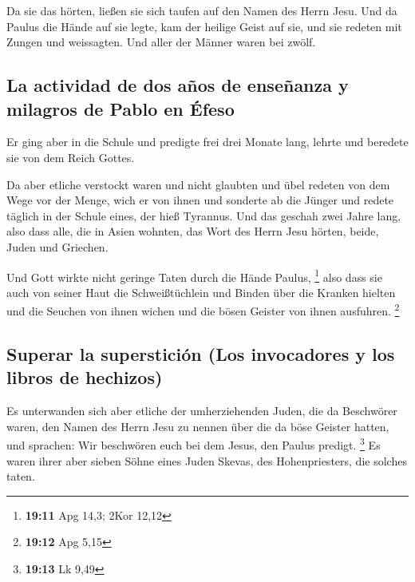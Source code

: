  Da sie das hörten, ließen sie sich taufen auf den Namen
des Herrn Jesu.  Und da Paulus die Hände auf sie legte,
kam der heilige Geist auf sie, und sie redeten mit Zungen und
weissagten.  Und aller der Männer waren bei zwölf.

\hypertarget{la-actividad-de-dos-auxf1os-de-enseuxf1anza-y-milagros-de-pablo-en-uxe9feso}{%
\subsection{La actividad de dos años de enseñanza y milagros de Pablo en
Éfeso}\label{la-actividad-de-dos-auxf1os-de-enseuxf1anza-y-milagros-de-pablo-en-uxe9feso}}

 Er ging aber in die Schule und predigte frei drei Monate
lang, lehrte und beredete sie von dem Reich Gottes.

 Da aber etliche verstockt waren und nicht glaubten und
übel redeten von dem Wege vor der Menge, wich er von ihnen und sonderte
ab die Jünger und redete täglich in der Schule eines, der hieß Tyrannus.
 Und das geschah zwei Jahre lang, also dass alle, die in
Asien wohnten, das Wort des Herrn Jesu hörten, beide, Juden und
Griechen.

 Und Gott wirkte nicht geringe Taten durch die Hände
Paulus, \footnote{\textbf{19:11} Apg 14,3; 2Kor 12,12} 
also dass sie auch von seiner Haut die Schweißtüchlein und Binden über
die Kranken hielten und die Seuchen von ihnen wichen und die bösen
Geister von ihnen ausfuhren. \footnote{\textbf{19:12} Apg 5,15}

\hypertarget{superar-la-supersticiuxf3n-los-invocadores-y-los-libros-de-hechizos}{%
\subsection{Superar la superstición (Los invocadores y los libros de
hechizos)}\label{superar-la-supersticiuxf3n-los-invocadores-y-los-libros-de-hechizos}}

 Es unterwanden sich aber etliche der umherziehenden
Juden, die da Beschwörer waren, den Namen des Herrn Jesu zu nennen über
die da böse Geister hatten, und sprachen: Wir beschwören euch bei dem
Jesus, den Paulus predigt. \footnote{\textbf{19:13} Lk 9,49}
 Es waren ihrer aber sieben Söhne eines Juden Skevas, des
Hohenpriesters, die solches taten.

